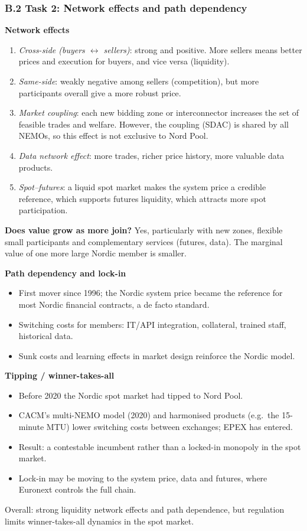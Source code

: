 \subsubsection*{B.2 Task 2: Network effects and path dependency}
\label{app:B2}
\begin{aiout}
\textbf{Network effects}
\begin{enumerate}
  \item \emph{Cross-side (buyers $\leftrightarrow$ sellers)}: strong and positive. More sellers means better prices and execution for buyers, and vice versa (liquidity).
  \item \emph{Same-side}: weakly negative among sellers (competition), but more participants overall give a more robust price.
  \item \emph{Market coupling}: each new bidding zone or interconnector increases the set of feasible trades and welfare. However, the coupling (SDAC) is shared by all NEMOs, so this effect is not exclusive to Nord Pool.
  \item \emph{Data network effect}: more trades, richer price history, more valuable data products.
  \item \emph{Spot--futures}: a liquid spot market makes the system price a credible reference, which supports futures liquidity, which attracts more spot participation.
\end{enumerate}
\textbf{Does value grow as more join?} Yes, particularly with new zones, flexible small participants and complementary services (futures, data). The marginal value of one more large Nordic member is smaller.

\textbf{Path dependency and lock-in}
\begin{itemize}
  \item First mover since 1996; the Nordic system price became the reference for most Nordic financial contracts, a de facto standard.
  \item Switching costs for members: IT/API integration, collateral, trained staff, historical data.
  \item Sunk costs and learning effects in market design reinforce the Nordic model.
\end{itemize}
\textbf{Tipping / winner-takes-all}
\begin{itemize}
  \item Before 2020 the Nordic spot market had tipped to Nord Pool.
  \item CACM's multi-NEMO model (2020) and harmonised products (e.g.\ the 15-minute MTU) lower switching costs between exchanges; EPEX has entered.
  \item Result: a contestable incumbent rather than a locked-in monopoly in the spot market.
  \item Lock-in may be moving to the system price, data and futures, where Euronext controls the full chain.
\end{itemize}
Overall: strong liquidity network effects and path dependence, but regulation limits winner-takes-all dynamics in the spot market.
\end{aiout}

